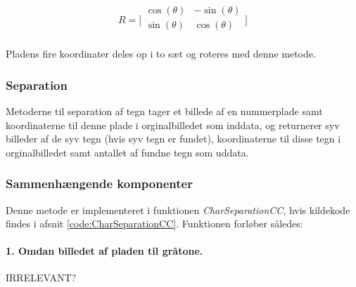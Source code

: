
\begin{displaymath} 
R = 
\biggl[ \begin{array}{cc} 
\cos(\theta) & - \sin(\theta) \\
\sin(\theta) & \cos(\theta) \\
\end{array} \biggr] 
\end{displaymath}

Pladens fire koordinater deles op i to sæt og roteres med denne metode.



\subsubsection{Separation}

Metoderne til separation af tegn tager et billede af en nummerplade samt koordinaterne til denne plade i orginalbilledet som inddata, og returnerer syv billeder af de syv tegn (hvis syv tegn er fundet), koordinaterne til disse tegn i orginalbilledet samt antallet af fundne tegn som uddata.

\subsubsection*{Sammenhængende komponenter}

Denne metode er implementeret i funktionen \textit{CharSeparationCC}, hvis kildekode findes i afsnit \vref{code:CharSeparationCC}. Funktionen forløber således:

\paragraph{1. Omdan billedet af pladen til gråtone.} IRRELEVANT?

